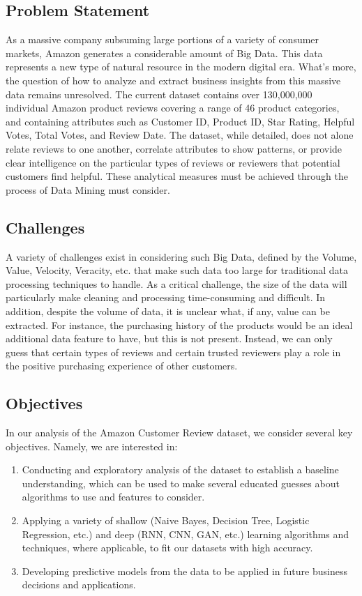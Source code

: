 \documentclass[12pt]{article}
\begin{document}
	\subsection{Problem Statement}\hspace{4ex} As a massive company subsuming large portions of a variety of consumer markets, Amazon generates a considerable amount of Big Data. This data represents a new type of natural resource in the modern digital era. What's more, the question of how to analyze and extract business insights from this massive data remains unresolved. The current dataset contains over 130,000,000 individual Amazon product reviews covering a range of 46 product categories, and containing attributes such as Customer ID, Product ID, Star Rating, Helpful Votes, Total Votes, and Review Date. The dataset, while detailed, does not alone relate reviews to one another, correlate attributes to show patterns, or provide clear intelligence on the particular types of reviews or reviewers that potential customers find helpful. These analytical measures must be achieved through the process of Data Mining must consider.	
	
	\subsection{Challenges}\hspace{4ex} A variety of challenges exist in considering such Big Data, defined by the Volume, Value, Velocity, Veracity, etc. that make such data too large for traditional data processing techniques to handle. As a critical challenge, the size of the data will particularly make cleaning and processing time-consuming and difficult. In addition, despite the volume of data, it is unclear what, if any, value can be extracted. For instance, the purchasing history of the products would be an ideal additional data feature to have, but this is not present. Instead, we can only guess that certain types of reviews and certain trusted reviewers play a role in the positive purchasing experience of other customers. 
	
	\subsection{Objectives}\label{Objectives}\hspace{4ex}In our analysis of the Amazon Customer Review dataset, we consider several key objectives. Namely, we are interested in:
	
	\begin{enumerate}
		\item Conducting and exploratory analysis of the dataset to establish a baseline understanding, which can be used to make several educated guesses about algorithms to use and features to consider.  
		\item Applying a variety of shallow (Naive Bayes, Decision Tree, Logistic Regression, etc.) and deep (RNN, CNN, GAN, etc.) learning algorithms and techniques, where applicable, to fit our datasets with high accuracy.
		\item Developing predictive models from the data to be applied in future business decisions and applications.
	\end{enumerate} 
\end{document}

